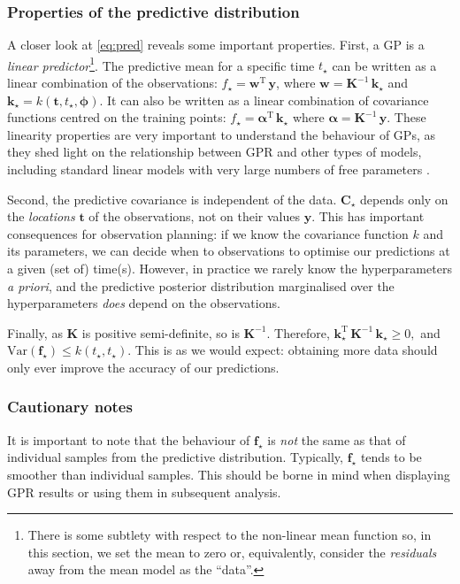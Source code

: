 \documentclass[letterpaper]{ar-1col}
\newcommand{\hyperparams}{\ensuremath{\boldsymbol{\phi}}}
\begin{document}
\subsubsection{Properties of the predictive distribution}
A closer look at \autoref{eq:pred} reveals some important properties.
First, a GP is a \textit{linear predictor}\footnote{%
  There is some subtlety with respect to the non-linear mean function so, in this section, we set the mean to zero or, equivalently, consider the \emph{residuals} away from the mean model as the ``data''.}.
The predictive mean for a specific time $t_\star$ can be written as a linear combination of the observations:
$f_\star = \mathbf{w}^{\mathrm{T}} \, \mathbf{y}$, where $\mathbf{w} = \mathbf{K}^{-1} \, \mathbf{k}_\star$ and $\mathbf{k}_\star=k(\mathbf{t},t_\star,\hyperparams)$. It can also be written as
a linear combination of covariance functions centred on the training points:
$f_\star = \mathbf{\alpha}^\mathrm{T} \,  \mathbf{k}_\star$ where $\mathbf{\alpha} = \mathbf{K}^{-1} \, \mathbf{y}$.
These linearity properties are very important to understand the behaviour of GPs, as they shed light on the relationship between GPR and other types of models, including standard linear models with very large numbers of free parameters \citep[see e.g.][for a more detailed discussion]{2021PASP..133i3001H}.

Second, the predictive covariance is independent of the data. $\mathbf{C}_\star$ depends only on the \emph{locations} $\mathbf{t}$ of the observations, not on their values $\mathbf{y}$. This has important consequences for observation planning: if we know the covariance function $k$ and its parameters, we can decide when to observations to optimise our predictions at a given (set of) time(s). However, in practice we rarely know the hyperparameters \textit{a priori}, and the predictive posterior distribution marginalised over the hyperparameters \textit{does} depend on the observations.

Finally, as $\mathbf{K}$ is positive semi-definite, so is $\mathbf{K}^{-1}$. Therefore, $\mathbf{k}_\star^{\mathrm{T}} \, \mathbf{K}^{-1} \, \mathbf{k}_\star \ge 0,$ and $\mathrm{Var}(\mathbf{f}_\star) \leq k(t_\star,t_\star)$. This is as we would expect: obtaining more data should only ever improve the accuracy of our predictions.

\subsubsection{Cautionary notes}
\label{sec:caution}
It is important to note that the behaviour of $\mathbf{f}_\star$ is \emph{not} the same as that of individual samples from the predictive distribution. Typically,  $\mathbf{f}_\star$ tends to be smoother than individual samples. This should be borne in mind when displaying GPR results or using them in subsequent analysis.
\end{document}

